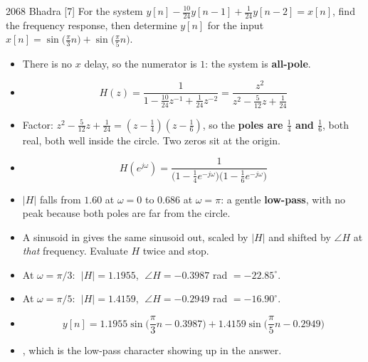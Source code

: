 
\hr

{\color{sub}\footnotesize {} }

\begin{asked}{2068 Bhadra \textperiodcentered{} [7]}
For the system $y[n]-\tfrac{10}{24}y[n-1]+\tfrac{1}{24}y[n-2]=x[n]$, find the frequency
response, then determine $y[n]$ for the input
$x[n]=\sin\!\big(\tfrac{\pi}{3}n\big)+\sin\!\big(\tfrac{\pi}{5}n\big)$.
\end{asked}

\begin{itemize}
  \item There is no $x$ delay, so the numerator is $1$: the system is \textbf{all-pole}.
  \item[] \[ H(z)=\frac{1}{1-\tfrac{10}{24}z^{-1}+\tfrac{1}{24}z^{-2}}
             =\frac{z^{2}}{z^{2}-\tfrac{5}{12}z+\tfrac{1}{24}} \]
  \item Factor: $z^{2}-\tfrac{5}{12}z+\tfrac{1}{24}=(z-\tfrac14)(z-\tfrac16)$, so the
        \textbf{poles are $\tfrac14$ and $\tfrac16$}, both real, both well inside the
        circle. Two zeros sit at the origin.
  \item[] \[ H(e^{j\omega})=\frac{1}{\big(1-\tfrac14e^{-j\omega}\big)
             \big(1-\tfrac16e^{-j\omega}\big)} \]
  \item $|H|$ falls from $1.60$ at $\omega=0$ to $0.686$ at $\omega=\pi$: a gentle
        \textbf{low-pass}, with no peak because both poles are far from the circle.
\end{itemize}

\begin{itemize}
  \item A sinusoid in gives the same sinusoid out, scaled by $|H|$ and shifted by
        $\angle H$ at \emph{that} frequency. Evaluate $H$ twice and stop.
  \item At $\omega=\pi/3$: $\;|H|=\mathbf{1.1955}$, $\;\angle H=\mathbf{-0.3987}$ rad
        $=-22.85^{\circ}$.
  \item At $\omega=\pi/5$: $\;|H|=\mathbf{1.4159}$, $\;\angle H=\mathbf{-0.2949}$ rad
        $=-16.90^{\circ}$.
  \item[] \[ y[n]=1.1955\sin\!\Big(\frac{\pi}{3}n-0.3987\Big)
             +1.4159\sin\!\Big(\frac{\pi}{5}n-0.2949\Big) \]
  \item {}, which is the low-pass character
        showing up in the answer.
\end{itemize}

